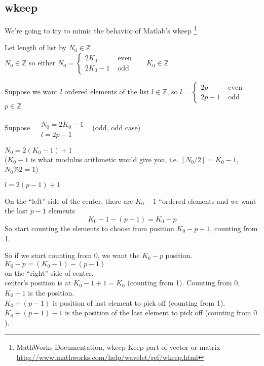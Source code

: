 \documentclass[twoside]{amsart}
\theoremstyle{plain}
\theoremstyle{definition}
\theoremstyle{remark}
\numberwithin{equation}{section}
\begin{document}
\subsection{wkeep}

We're going to try to mimic the behavior of Matlab's wkeep \footnote{MathWorks Documentation, wkeep Keep part of vector or matrix \url{http://www.mathworks.com/help/wavelet/ref/wkeep.html}}

Let length of list by $N_0 \in \mathbb{Z}$ \\
$N_0 \in \mathbb{Z}$ so either $N_0 = \begin{cases} 2K_0 & \text{ even } \\
  2K_0 - 1 & \text{ odd } \end{cases} \quad \,  \, K_0 \in \mathbb{Z}$ 

Suppose we want $l$ ordered elements of the list $l \in \mathbb{Z}$, so $l = \begin{cases} 2p & \text{ even } \\ 
  2p-1 & \text{ odd } \end{cases}$ \, $p\in \mathbb{Z}$

Suppose $\begin{aligned} & \quad \\
  & N_0  = 2K_0 - 1 \\
  & l = 2p - 1 \end{aligned}$ \quad \, (odd, odd case)

$N_0 = 2(K_0 - 1) +1$ \\
($K_0-1$ is what modulus arithmetic would give you, i.e. $[N_0/2] = K_0-1$, $N_0 \% 2 = 1$)

$l=2(p-1)+1$

On the ``left'' side of the center, there are $K_0 - 1$ ``ordered elements and we want the last $p-1$ elements 
\[
K_0 - 1-(p-1) = K_0-p
\]
So start counting the elements to choose from position $K_0-p+1$, counting from 1.

So if we start counting from $0$, we want the $K_0 - p$ position. $K_0 - p=(K_0-1)-(p-1)$ \\
on the ``right'' side of center, \\
center's position is at $K_0 - 1+1 = K_0$ (counting from 1).  Counting from $0$, $K_0-1$ is the position. \\
$K_0+(p-1)$ is position of last element to pick off (counting from 1).  $K_0 + (p-1)-1$ is the position of the last element to pick off (counting from $0$). \\
\end{document}
